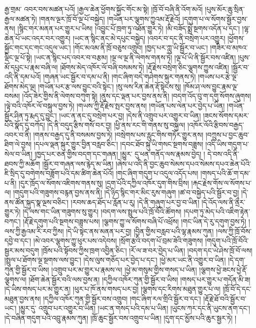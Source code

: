 རྒྱ་གྲམ་​ འབར་བས་མཚན་པའོ། །རྒྱལ་ཆེན་ཕྱོགས་སྐྱོང་གོང་མ་སྟེ། །ཁྲོ་བོ་བཞི་ནི་འོག་མའོ། །པུས་མོར་ཆུ་སྲིན་རྒྱལ་མཚན་ཏེ། །གནས་ལྔར་ཁྲོ་བོ་ལྔ་པོ་བསྐྱེད། །གཡོན་པར་ལྕགས་ཀྱུའམ་རྡོ་རྗེའོ། །དགུག་པ་ལ་སོགས་སྦྱོར་བྱས་ནས། །སྙིང་གར་མནན་པར་གྱུར་པ་ཡིས། །འབྱུང་པོ་ཁྲག་ཏུ་འཐོན་གྱུར་ཏེ། །མི་བཟོད་སྨྲེ་སྔགས་འདོན་པ་དང་། །ལྷ་ཆེན་པོ་ཡང་འདར་བར་འགྱུར། །ཡང་ན་སྙིང་ནང་མེ་དཔུང་བསྐྱེད། །འབར་བ་དང་ནི་བསྲེག་པར་འགྱུར། །ཕྱོགས་སྐྱོང་གང་དང་གང་འདུལ་ཡང་། །གོང་མའམ་ནི་ཁྲོ་བཅུས་འགྲུབ། །ཁྱད་པར་ཀླུ་ཡི་སྦྱོར་བ་ཡང་། །གཟིར་བ་མཁའ་ལྡིང་ལྔ་པོ་སྟེ། །ཡང་ན་སྙིང་པད་འབར་བ་བརྩམ། །ལྔ་ལ་ལྔ་ནི་ལེགས་གནས་ཏེ། །ལྔ་པོ་ཡི་ནི་སྦྱོར་བས་འཛིན། །པུས་མོ་དཔུང་པ་རྣམ་བཞི་ལ། །ཐོགས་མེད་འཁོར་ལོ་བཞི་བསམས་ཏེ། །རྡོ་རྗེས་བསྲེག་ཅིང་ལྕགས་ཀྱུས་འཛིན། །སྦྱོར་བ་འདི་ནི་དམ་པའོ། །གཞན་ཡང་སྦྱོར་བ་དམ་པ་ནི། །གང་ཞིག་བདེ་གཤེགས་སྐུར་གནས་ཏེ། །གཡས་པར་རྩེ་ལྔ་ཐོགས་མེད་ལྔ། །གཡོན་པར་རྩ་ལས་བྱུང་བའི་སྟེང་། །སུ་ལས་རིན་ཆེན་རྡོ་སྟེངས་སུ། །ཁོམ་ཤ་ལས་བྱུང་རྣམ་ལྔ་བསམ། །འོད་ཟེར་གྱིས་ནི་ལེགས་བཀུག་སྟེ། །ནུས་དང་ལྡན་པར་བྱས་ནས་ནི། །བདག་འོད་བུ་ག་དགུ་སོགས་ཞུགས། །ལྟེ་བའི་འཁོར་ལོ་བསྐུལ་བྱས་ཏེ། །གཡས་ཀྱི་རྡོ་རྗེས་སྤར་བྱས་ནས། །གཡོན་པས་ལེན་པར་བྱེད་པ་ཡིན། །གཡོན་སྦྱོར་ཤིན་ཏུ་རྨད་དུ་བྱུང་། །ཡང་ན་ནང་དུ་བསྲེག་པར་བྱ། །དེས་ནི་འགྲུབ་པར་འགྱུར་བ་ཡིན། །ཟངས་སོགས་དམར་པོའི་སྣོད་དུ་བཀོད། །དེ་ནི་བདུད་རྩིས་གསོ་བར་བྱ། །ཕྱི་ནས་རང་གི་གནས་སུ་བསྐྱལ། །འཁོར་ལོའི་རྩིབས་བརྒྱད་འབར་བ་ནི། །གནས་བརྒྱད་དུ་ནི་བསམས་བྱས་ཏེ། །བསྲེགས་པས་རླུང་གིས་གཏོར་གྱུར་ནས། །བཀྲུས་པ་བྱང་ཆུབ་ཐིག་ལེ་བྱས། །དཔལ་ལྡན་སྐུར་གྱུར་བྱིན་བརླབ་ཅིང་། །དབང་ཐོབ་སྐུ་ཡི་གསང་སྔགས་བཟླས། །འདི་ཡིས་གདུག་པ་སེལ་བ་ཡིན། །ཁྱད་པར་ཅན་གྱིས་བདག་དང་གཞན། །མྱུར་​ དུ་ཕན་གནོད་ལས་རྣམས་བྱེད། །
དེ་བས་འདི་ནི་ཐབས་ཀྱི་མཆོག །སྦྱོར་བ་གཞན་ལས་རྙེད་མ་ཡིན། །ཞེས་པ་འདི་ནི་བྱང་ཆུབ་སེམས་དཔའ་སེམས་དཔའ་ཆེན་པོའི་ཇི་སྲིད་དུ་བགེགས་བཟློག་པའི་དམ་ཚིག་ཆེན་པོའོ། །གང་ཞིག་གདུག་པ་འདུལ་འདོད་པས། །གསད་པའི་ཆོ་ག་དམ་པ་ནི། །དུར་ཁྲོད་ལ་སོགས་འཇིགས་གནས་སུ། །དྲག་པོའི་དཀྱིལ་འཁོར་དུག་གིས་བྲིས། །རྐང་རྗེས་གོས་ལ་སོགས་པ་ལ། །གདུག་པའི་གཟུགས་བརྙན་བྱས་ནས་ནི། །དེ་ཉིད་སྙིང་གར་མིང་རུས་གཞུག །ཚ་བ་བསྐྱེད་པའི་སྦྱོར་བ་བྱ། །དེ་ནས་ཚོན་སྐུད་སྣ་ལྔས་བཅིང་། །རབས་ཆད་ཐོད་པ་རློན་པ་རུ། །དེ་ནི་གཞུག་པར་བྱ་བ་ཡིན། །དེ་འོད་ལས་ནི་ནྲྀར་གྱུར་ཏེ། །དེ་ལས་གང་ཡིན་གཟུགས་སུ་གྱུར། །བདག་ལས་སྤྲུལ་པའི་ཁྲོ་བོའི་ཚོགས། །དཔག་ཏུ་མེད་པའི་འཇིག་རྟེན་བཀང་། །རྡོ་རྗེ་དགུག་པའི་སྔགས་བཟླས་པས། །ལྕགས་ཀྱུ་ལ་སོགས་བཞི་པོ་འཕྲོས། །གང་ཡིན་དེ་རུ་དགུག་བྱས་ཏེ། །ལས་ཀྱི་རྒྱའམ་རི་རབ་ཀྱིས། །དེ་ཡི་སྟེང་ནས་མནན་པར་བྱ། །བྱིན་གྱིས་བརླབ་པའི་ལྷ་རྣམས་ཀུན། །ལས་ཀྱི་ཁྲོ་བོས་དབྱེ་བ་དང་། །མེ་འབར་ལྕགས་ཀྱུ་ཕུར་པས་འདེབས། །སྲོག་རྩའི་བདག་པོ་བྲམ་ཟེའི་གཟུགས། །གདུག་པའི་ཁྲོ་བོའི་སྦྱར་མས་བདུག །ཁྲོས་པའི་སྟོབས་ཀྱིས་ཁྲག་འབྱིན་ཅིང་། །རོ་ལ་ཟ་བར་བྱེད་པ་ཡིན། །བདག་དང་ཡེ་ཤེས་ཁྲོ་བོ་ལས། །སྤྲུལ་པ་ཐོགས་ལྔ་སྔགས་ལས་བྱུང་། །དེས་ལུས་གཅོད་པར་བྱེད་པ་དང་། །ཕྱེ་མར་ཡང་ནི་འགྱུར་བ་ཡིན། །དེ་དག་ཀུན་གྱི་སྦྱོར་བ་ཡིས། །འགྲུབ་པར་མ་གྱུར་པ་རྣམས་ལ། །ཕྱེ་མ་གསུམ་གྱིས་གསད་པ་ཡིན། །ལྕགས་ཕྱེ་ཟངས་ཕྱེ་རྡོ་ལྕགས་ལ། །ཐོག་ཆེན་སྦྱོར་བའི་ལས་བྱས་ན། །དཀྱིལ་འཁོར་ཀུན་གྱི་སྦྱོར་བ་ཡིས། །གསད་པར་གྱུར་པ་གདོན་མི་ཟ། །དེ་ཡིས་གསད་པར་མ་གྱུར་ན། །ཕུར་པ་ཁོ་ནས་གསད་པར་བྱ། །ལྕགས་དང་རིགས་མཐུན་གྱུར་པ་ལ། །ཁྲོ་བོ་དེ་དང་མཐུན་བྱས་ནས། །དཀྱིལ་འཁོར་ཀུན་གྱི་སྦྱོར་བས་འགྲུབ། །གང་ཞིག་རལ་གྲིའི་སྦྱོར་བ་དང་། །རྡོ་རྗེ་ཐོ་བའི་སྦྱོར་བ་ཡང་། །མྱུར་དུ་​ འགྲུབ་པར་འགྱུར་བ་ཡིན། །ཡང་ན་གསད་པའི་དམ་པ་ཡིན། །ཡུངས་ཀར་དང་ནི་ཡུངས་ནག་དང་། །དེ་བཞིན་གདུག་པའི་འབྲུ་རྣམས་ཀུན། །ཁྲོ་ཆུང་སྦྱོར་བས་འགྲུབ་པ་ཡིན། །དུག་དང་མྱོས་པའི་ཆུར་སྦྱར་ཏེ། །
